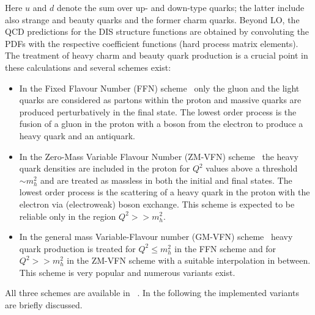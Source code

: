 Here $u$ and $d$ denote the sum over up- and down-type quarks;
the latter include also strange and beauty quarks and 
the former charm quarks.
%
Beyond LO, 
the QCD predictions for the DIS structure functions are obtained by convoluting 
the PDFs with the respective coefficient functions (hard process matrix elements).
%
The treatment of 
heavy charm and beauty quark production is a crucial point in these calculations
and several schemes exist:
\begin{itemize}
\item
In the Fixed Flavour Number (FFN) 
scheme~\cite{Laenen:1992, Laenen:1993, Riem:1995}
 only the gluon and the light quarks are considered
as partons within the proton and massive 
quarks are produced perturbatively in the final state.
The lowest order process is the fusion of a gluon in the proton
with a boson from the electron to produce a heavy quark and an antiquark.
\item
In the Zero-Mass Variable Flavour Number (ZM-VFN) scheme~\cite{ZMVFNpub} the
heavy quark densities are included in the proton for $Q^2$ values above a threshold $\sim m_h^2$
and
are treated as massless in both the initial 
and final states. The lowest order process is the scattering
of a heavy quark in the proton with the electron via (electroweak) boson exchange.
This scheme is expected to be reliable only in the region $Q^2>>m_h^2$.
\item
In the general mass Variable-Flavour number (GM-VFN)
scheme~\cite{VFN} heavy quark production is treated for
 $Q^2 \le m_h^2$ in the FFN scheme and  for $Q^2 >> m_h^2$
in the ZM-VFN scheme with a suitable interpolation in between.
This scheme is very popular and numerous variants exist.
\end{itemize}
All three schemes are available in \fitter\ . In the following
the implemented variants are briefly discussed.
% 
